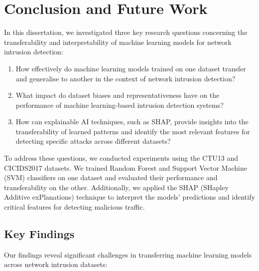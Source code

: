 \chapter{Conclusion and Future Work}\label{chap:conclusion-future-work}

In this dissertation, we investigated three key research questions concerning the transferability and interpretability of machine learning models for network intrusion detection:

\begin{enumerate}
    \item How effectively do machine learning models trained on one dataset transfer and generalise to another in the context of network intrusion detection?
    \item What impact do dataset biases and representativeness have on the performance of machine learning-based intrusion detection systems?
    \item How can explainable AI techniques, such as SHAP, provide insights into the transferability of learned patterns and identify the most relevant features for detecting specific attacks across different datasets?
\end{enumerate}

To address these questions, we conducted experiments using the CTU13 and CICIDS2017 datasets. We trained Random Forest and Support Vector Machine (SVM) classifiers on one dataset and evaluated their performance and transferability on the other. Additionally, we applied the SHAP (SHapley Additive exPlanations) technique to interpret the models’ predictions and identify critical features for detecting malicious traffic.

\section{Key Findings}

Our findings reveal significant challenges in transferring machine learning models across network intrusion datasets:


